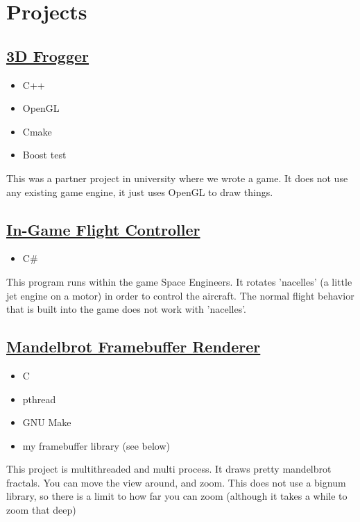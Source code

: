 \documentclass{amsart}
\theoremstyle{definition} %
\begin{document}
\pagebreak
\section{Projects}

\subsection{\href{https://github.com/Hazelfire/I3DAssignment2}{3D Frogger}}
\begin{itemize}
	\item C++
	\item OpenGL
	\item Cmake
	\item Boost test
\end{itemize}
This was a partner project in university where we wrote a game.
It does not use any existing game engine, it just uses OpenGL to draw
things.

\subsection{\href{https://github.com/1wsx10/VectorThrust2}{In-Game Flight Controller}}
\begin{itemize}
	\item C\#
\end{itemize}
This program runs within the game Space Engineers. It rotates
'nacelles' (a little jet engine on a motor) in order to control the
aircraft. The normal flight behavior that is built into the game does
not work with 'nacelles'.

\subsection{\href{https://github.com/1wsx10/mandelbrot}{Mandelbrot Framebuffer Renderer}}
\begin{itemize}
	\item C
	\item pthread
	\item GNU Make
	\item my framebuffer library (see below)
\end{itemize}
This project is multithreaded and multi process. It draws pretty
mandelbrot fractals. You can move the view around, and zoom.
This does not use a bignum library, so there is a limit to how far
you can zoom (although it takes a while to zoom that deep)
\end{document}
